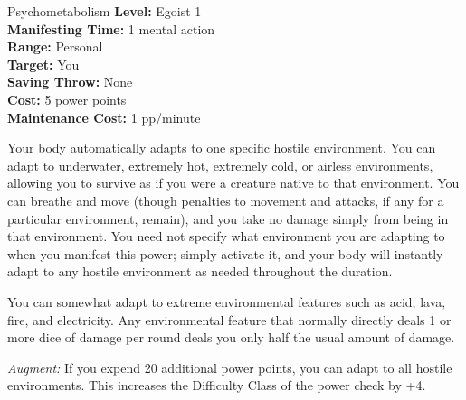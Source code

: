 {Psychometabolism}
{
	\textbf{Level:}
	Egoist 1\\
	\textbf{Manifesting Time:}
	1 mental action\\
	\textbf{Range:}
	Personal\\
	\textbf{Target:}
	You\\
	\textbf{Saving Throw:}
	None\\
	\textbf{Cost:}
	5 power points\\
	\textbf{Maintenance Cost:}
	1 pp/minute\\
}
{
	Your body automatically adapts to one specific hostile environment. You can adapt to underwater, extremely hot, extremely cold, or airless environments, allowing you to survive as if you were a creature native to that environment. You can breathe and move (though penalties to movement and attacks, if any for a particular environment, remain), and you take no damage simply from being in that environment. You need not specify what environment you are adapting to when you manifest this power; simply activate it, and your body will instantly adapt to any hostile environment as needed throughout the duration.

	You can somewhat adapt to extreme environmental features such as acid, lava, fire, and electricity. Any environmental feature that normally directly deals 1 or more dice of damage per round deals you only half the usual amount of damage.

	\textit{Augment:} If you expend 20 additional power points, you can adapt to all hostile environments. This increases the Difficulty Class of the power check by +4.
}